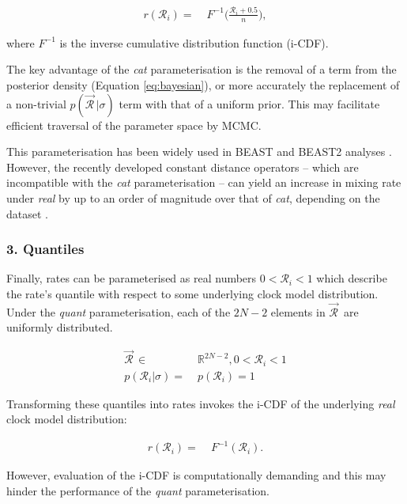 \documentclass[10pt,letterpaper]{article}
\begin{document}
\begin{align}
r(\mathcal{R}_i) =& \; F^{-1}\big(\frac{\mathcal{R}_i + 0.5}{n}\big),
\end{align}

where $F^{-1}$ is the inverse cumulative distribution function (i-CDF).



The key advantage of the \textit{cat} parameterisation is the removal of a term from the posterior density (Equation \ref{eq:bayesian}), or more accurately the replacement of a non-trivial $p(\vec{\mathcal{R}}^{\,} | \sigma)$ term with that of a uniform prior. 
This may facilitate efficient traversal of the parameter space by MCMC.




This parameterisation has been widely used in BEAST and BEAST2 analyses \cite{drummond2006relaxed}. 
However, the recently developed constant distance operators  -- which are incompatible with the \textit{cat} parameterisation -- can yield an increase in mixing rate under \textit{real} by up to an order of magnitude over that of \textit{cat}, depending on the dataset \cite{zhang2020improving}. 






\subsubsection*{3. Quantiles}


Finally, rates can be parameterised as real numbers $0 < \mathcal{R}_i < 1$ which describe the rate's quantile with respect to some underlying clock model distribution. Under the  \textit{quant} parameterisation, each of the $2N-2$ elements in $\vec{\mathcal{R}}^{\,}$ are uniformly distributed.


\begin{align}
\vec{\mathcal{R}}^{\,} \in & \; \mathbb{R}^{2N-2}, 0 < \mathcal{R}_i < 1  \\
p(\mathcal{R}_i | \sigma) = & \; p(\mathcal{R}_i) = 1
\end{align}


Transforming these quantiles into rates invokes the i-CDF of the underlying \textit{real} clock model distribution:


\begin{align}
r(\mathcal{R}_i) =& \; F^{-1}(\mathcal{R}_i).
\end{align}


However, evaluation of the i-CDF is computationally demanding and this may hinder the performance of the \textit{quant} parameterisation.
\end{document}
